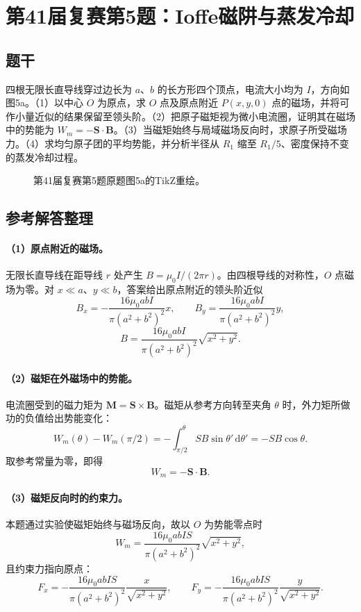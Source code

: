 \section{第41届复赛第5题：Ioffe磁阱与蒸发冷却}
\subsection{题干}
四根无限长直导线穿过边长为 $a$、$b$ 的长方形四个顶点，电流大小均为 $I$，方向如图5a。（1）以中心 $O$ 为原点，求 $O$ 点及原点附近 $P(x,y,0)$ 点的磁场，并将可作小量近似的结果保留至领头阶。（2）把原子磁矩视为微小电流圈，证明其在磁场中的势能为 $W_m=-\boldsymbol S\cdot\boldsymbol B$。（3）当磁矩始终与局域磁场反向时，求原子所受磁场力。（4）求均匀原子团的平均势能，并分析半径从 $R_1$ 缩至 $R_1/5$、密度保持不变的蒸发冷却过程。
\begin{figure}[htbp]\centering\caption{第41届复赛第5题原题图5a的TikZ重绘。}\end{figure}
\subsection{参考解答整理}
\paragraph{（1）原点附近的磁场。}
无限长直导线在距导线 $r$ 处产生 $B=\mu_0I/(2\pi r)$。由四根导线的对称性，$O$ 点磁场为零。对 $x\ll a$、$y\ll b$，答案给出原点附近的领头阶近似
\[B_x=-\frac{16\mu_0abI}{\pi(a^2+b^2)^2}x,\qquad B_y=\frac{16\mu_0abI}{\pi(a^2+b^2)^2}y,\]
\[B=\frac{16\mu_0abI}{\pi(a^2+b^2)^2}\sqrt{x^2+y^2}.\]
\paragraph{（2）磁矩在外磁场中的势能。}
电流圈受到的磁力矩为 $\boldsymbol M=\boldsymbol S\times\boldsymbol B$。磁矩从参考方向转至夹角 $\theta$ 时，外力矩所做功的负值给出势能变化：
\[
W_m(\theta)-W_m(\pi/2)=-\int_{\pi/2}^{\theta}SB\sin\theta'\,\mathrm d\theta'
=-SB\cos\theta.
\]
取参考常量为零，即得
\[\boxed{W_m=-\boldsymbol S\cdot\boldsymbol B}.\]
\paragraph{（3）磁矩反向时的约束力。}
本题通过实验使磁矩始终与磁场反向，故以 $O$ 为势能零点时
\[W_m=\frac{16\mu_0abIS}{\pi(a^2+b^2)^2}\sqrt{x^2+y^2},\]
且约束力指向原点：
\[F_x=-\frac{16\mu_0abIS}{\pi(a^2+b^2)^2}\frac{x}{\sqrt{x^2+y^2}},\qquad F_y=-\frac{16\mu_0abIS}{\pi(a^2+b^2)^2}\frac{y}{\sqrt{x^2+y^2}}.\]

